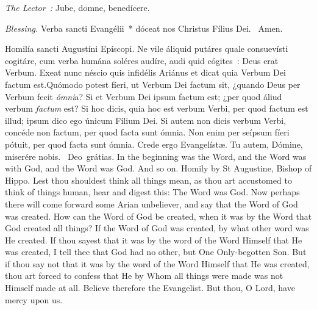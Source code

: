 {{  }

  {
    \bigskip
    {
    }
    \medskip

    \emph{The Lector~:} Jube, domne, benedícere.

    \emph{Blessing.} Verba sancti Evangélii~* dóceat nos Christus Fílius Dei. \Rbar{}~Amen.
  }

  \bigskip{}
  {


  }

  {

    \begin{parcolumns}[rulebetween,colwidths={1=.45\linewidth}]{2}
    {Homilía sancti Augustíni Epíscopi.}%
    {Ne vile áliquid putáres quale consuevísti cogitáre, cum verba humána soléres audíre, audi quid cógites~: Deus erat Verbum. Exeat nunc néscio quis infidélis Ariánus et dicat quia Verbum Dei factum est.}{Quómodo potest fíeri, ut Verbum Dei factum sit, ¿quando Deus per Verbum fecit \emph{ómni}a? Si et Verbum Dei ipsum factum est; ¿per quod áliud verbum \emph{factum} est? Si hoc dicis, quia hoc est verbum Verbi, per quod factum est illud; ipsum dico ego únicum Fílium Dei. Si autem non dicis verbum Verbi, concéde non factum, per quod facta sunt ómnia. Non enim per seípsum fíeri pótuit, per quod facta sunt ómnia. Crede ergo Evangelístæ.
      Tu autem, Dómine, miserére nobis.
      \Rbar{}~Deo~grátias.}%
    {In the beginning was the Word, and the Word was with God, and the Word was God. And so on.}%
    {Homily by St Augustine, Bishop of Hippo.}%
    {Lest thou shouldest think all things mean, as thou art accustomed to think of things human, hear and digest this: The Word was God. Now perhaps there will come forward some Arian unbeliever, and say that the Word of God was created. How can the Word of God be created, when it was by the Word that God created all things? If the Word of God was created, by what other word was He created. If thou sayest that it was by the word of the Word Himself that He was created, I tell thee that God had no other, but One Only-begotten Son. But if thou say not that it was by the word of the Word Himself that He was created, thou art forced to confess that He by Whom all things were made was not Himself made at all. Believe therefore the Evangelist.
      But thou, O Lord, have mercy upon us.}
    \end{parcolumns}

}}
